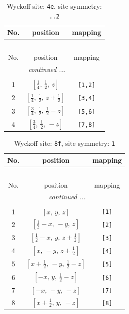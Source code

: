 \documentclass[fleqn,8pt]{jsarticle}
\begin{document}
\renewcommand{\arraystretch}{1.2}
\begin{longtable}{ccc}
\caption{Wyckoff site: {\tt 4e}, site symmetry: {\tt ..2}}
 \\
 \hline \hline
No. & position & mapping \\ \hline \endfirsthead

\multicolumn{2}{l}{\tablename\ \thetable{}} \\
 \hline \hline
No. & position & mapping \\ \hline \endhead

 \hline \hline
\multicolumn{2}{r}{\footnotesize\it continued ...} \\ \endfoot

 \hline \hline
\multicolumn{2}{r}{} \\ \endlastfoot

1 & $\left[ \frac{1}{4},\, \frac{1}{2},\, z \right]$ & {\tt [1,2]} \\ \hline
2 & $\left[ \frac{1}{4},\, \frac{1}{2},\, z + \frac{1}{2} \right]$ & {\tt [3,4]} \\ \hline
3 & $\left[ \frac{3}{4},\, \frac{1}{2},\, \frac{1}{2} - z \right]$ & {\tt [5,6]} \\ \hline
4 & $\left[ \frac{3}{4},\, \frac{1}{2},\, - z \right]$ & {\tt [7,8]} \\
\end{longtable}
\renewcommand{\arraystretch}{1.2}
\begin{longtable}{ccc}
\caption{Wyckoff site: {\tt 8f}, site symmetry: {\tt 1}}
 \\
 \hline \hline
No. & position & mapping \\ \hline \endfirsthead

\multicolumn{2}{l}{\tablename\ \thetable{}} \\
 \hline \hline
No. & position & mapping \\ \hline \endhead

 \hline \hline
\multicolumn{2}{r}{\footnotesize\it continued ...} \\ \endfoot

 \hline \hline
\multicolumn{2}{r}{} \\ \endlastfoot

1 & $\left[ x,\, y,\, z \right]$ & {\tt [1]} \\ \hline
2 & $\left[ \frac{1}{2} - x,\, - y,\, z \right]$ & {\tt [2]} \\ \hline
3 & $\left[ \frac{1}{2} - x,\, y,\, z + \frac{1}{2} \right]$ & {\tt [3]} \\ \hline
4 & $\left[ x,\, - y,\, z + \frac{1}{2} \right]$ & {\tt [4]} \\ \hline
5 & $\left[ x + \frac{1}{2},\, - y,\, \frac{1}{2} - z \right]$ & {\tt [5]} \\ \hline
6 & $\left[ - x,\, y,\, \frac{1}{2} - z \right]$ & {\tt [6]} \\ \hline
7 & $\left[ - x,\, - y,\, - z \right]$ & {\tt [7]} \\ \hline
8 & $\left[ x + \frac{1}{2},\, y,\, - z \right]$ & {\tt [8]} \\
\end{longtable}
\end{document}
